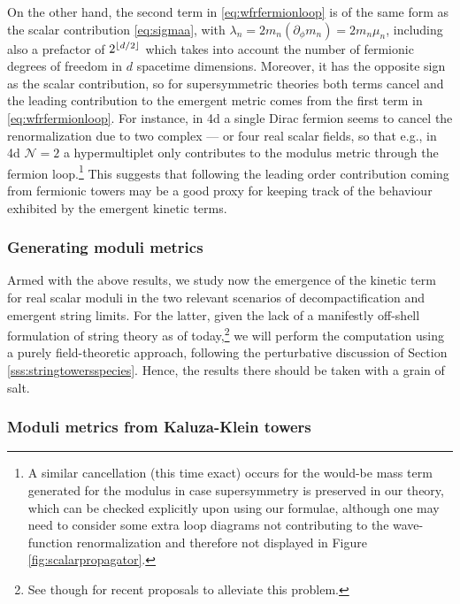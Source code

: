 %
On the other hand, the second term in \eqref{eq:wfrfermionloop} is of the same form as the scalar contribution \eqref{eq:sigmaa}, with $\lambda_n= 2 m_n (\partial_\phi m_n)=2 m_n \mu_n$, including also a prefactor of $2^{\lfloor d/2 \rfloor}$ which takes into account the number of fermionic degrees of freedom in $d$ spacetime dimensions. Moreover, it has the opposite sign as the scalar contribution, so for supersymmetric theories both terms cancel and the leading contribution to the emergent metric comes from the first term in \eqref{eq:wfrfermionloop}. For instance, in 4d a single Dirac fermion seems to cancel the renormalization due to two complex --- or four real scalar fields, so that e.g., in 4d $\mathcal{N}=2$ a hypermultiplet only contributes to the modulus metric through the fermion loop.\footnote{A similar cancellation (this time exact) occurs for the would-be mass term generated for the modulus in case supersymmetry is preserved in our theory, which can be checked explicitly upon using our formulae, although one may need to consider some extra loop diagrams not contributing to the wave-function renormalization and therefore not displayed in Figure \ref{fig:scalarpropagator}.} This suggests that following the leading order contribution coming from fermionic towers may be a good proxy for keeping track of the behaviour exhibited by the emergent kinetic terms.
	
	
\subsubsection{Generating moduli metrics}
\label{sss:emergencemodulimetric}
	
Armed with the above results, we study now the emergence of the kinetic term for real scalar moduli in the two relevant scenarios of decompactification and emergent string limits. For the latter, given the lack of a manifestly off-shell formulation of string theory as of today,\footnote{See \cite{Ahmadain:2022tew,Ahmadain:2022eso} though for recent proposals to alleviate this problem.} we will perform the computation using a purely field-theoretic approach, following the perturbative discussion of Section \ref{sss:stringtowersspecies}. Hence, the results there should be taken with a grain of salt. 
	
\subsubsection*{Moduli metrics from  Kaluza-Klein towers}
	
